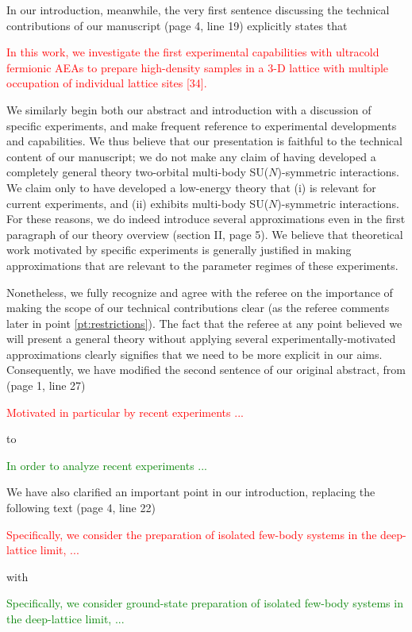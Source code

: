 \documentclass[preprint]{revtex4-1}
\newcommand{\1}{\mathds{1}}
\newcommand{\red}[1]{\textcolor{red}{#1}}
\newcommand{\green}[1]{\textcolor{green}{#1}}
\begin{document}
\begin{enumerate}
  In our introduction, meanwhile, the very first sentence discussing
  the technical contributions of our manuscript (page 4, line 19)
  explicitly states that

  \red{In this work, we investigate the first experimental
    capabilities with ultracold fermionic AEAs to prepare high-density
    samples in a 3-D lattice with multiple occupation of individual
    lattice sites [34].}

  We similarly begin both our abstract and introduction with a
  discussion of specific experiments, and make frequent reference to
  experimental developments and capabilities.  We thus believe that
  our presentation is faithful to the technical content of our
  manuscript; we do not make any claim of having developed a
  completely general theory two-orbital multi-body SU($N$)-symmetric
  interactions.  We claim only to have developed a low-energy theory
  that (i) is relevant for current experiments, and (ii) exhibits
  multi-body SU($N$)-symmetric interactions.  For these reasons, we do
  indeed introduce several approximations even in the first paragraph
  of our theory overview (section II, page 5).  We believe that
  theoretical work motivated by specific experiments is generally
  justified in making approximations that are relevant to the
  parameter regimes of these experiments.

  Nonetheless, we fully recognize and agree with the referee on the
  importance of making the scope of our technical contributions clear
  (as the referee comments later in point \ref{pt:restrictions}).  The
  fact that the referee at any point believed we will present a
  general theory without applying several experimentally-motivated
  approximations clearly signifies that we need to be more explicit in
  our aims.  Consequently, we have modified the second sentence of our
  original abstract, from (page 1, line 27)

  \red{Motivated in particular by recent experiments ...}

  to

  \green{In order to analyze recent experiments ...}

  We have also clarified an important point in our introduction,
  replacing the following text (page 4, line 22)

  \red{Specifically, we consider the preparation of isolated few-body
    systems in the deep-lattice limit, ...}

  with

  \green{Specifically, we consider ground-state preparation of
    isolated few-body systems in the deep-lattice limit, ...}


\end{enumerate}
\end{document}
